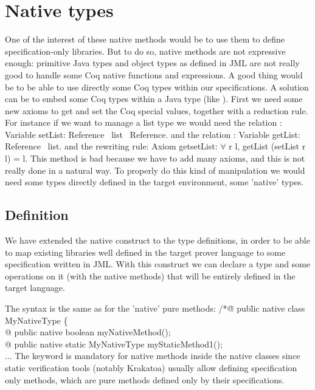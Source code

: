\section{Native types}
One of the interest of these native methods would be to use them to define  
specification-only libraries. But to do so, native methods are not expressive 
enough: primitive Java types and object types as defined in JML are not 
really good to handle some Coq native functions and expressions.
A good thing would be to be able to use directly some Coq types within our 
specifications.
A solution can be to embed some Coq types within a Java type 
(like ).
First we need some new axioms to get and set the Coq special values, together with a reduction rule. 
For instance if we want to manage a list type
we would need the relation :
\btab
Variable setList: Reference \rarrow \ list \rarrow \ Reference.
\etab
and the relation :
\btab
Variable getList:  Reference \rarrow \ list.
\etab
and the rewriting rule:
\btab
Axiom getsetList: $\forall$ r l, getList (setList r l) = l.
\etab 
This method is bad because we have to add many axioms, and this is not really 
done in a natural way.
To properly do this kind of manipulation we would need some types directly defined 
in the target environment,  some 'native' types.

\subsection{Definition}
We have extended the native construct to the type definitions, in order to be able to map
existing libraries well defined in the target prover language to some specification written in
JML. With this construct we can declare a type and some operations on it (with the native methods)
that will be entirely defined in the target language.

The syntax is the same as for the 'native' pure methods:
\btab
/*\=@ pub\=lic native class MyNativeType \{\+\\
   @ \> public native boolean myNativeMethod();\\
   @ \> public native static MyNativeType myStaticMethod1();\\
   ...
\etab
The  keyword is mandatory for native methods inside the native classes 
since static verification tools (notably Krakatoa) usually allow defining specification only 
methods, which are pure methods defined only by their specifications.

